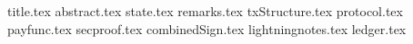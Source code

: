 \documentclass[11pt]{llncs}
\begin{document}
{title.tex}
\thispagestyle{plain}
{abstract.tex}
{state.tex}
{remarks.tex}
{txStructure.tex}
{protocol.tex}
{payfunc.tex}
{secproof.tex}
{combinedSign.tex}
{lightningnotes.tex}
{ledger.tex}


\end{document}
